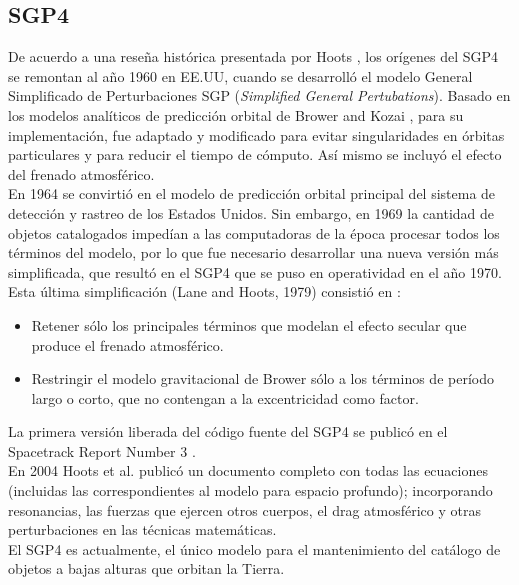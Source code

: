 {\subsection{SGP4}\label{subsec:sgp4model}
De acuerdo a una rese\~na hist\'orica presentada por Hoots \citep{hootshistoria}, los or\'igenes del SGP4 se remontan al a\~no 1960 en EE.UU, cuando se desarroll\'o el modelo General Simplificado de Perturbaciones SGP  ({\it{Simplified General Pertubations}}). Basado en los modelos anal\'iticos de predicci\'on orbital de Brower \citep{brouwer1959solution} and Kozai \citep{kozai1962second}, para su implementaci\'on, fue adaptado y modificado para evitar singularidades en \'orbitas particulares y para reducir el tiempo de c\'omputo. As\'i mismo se incluy\'o el efecto del frenado atmosf\'erico.\\
En 1964 se convirti\'o en el modelo de predicci\'on orbital principal del sistema de detecci\'on y rastreo de los Estados Unidos.
Sin embargo, en 1969 la cantidad de objetos catalogados imped\'ian a las computadoras de la \'epoca procesar todos los t\'erminos del modelo, por lo que fue necesario desarrollar una nueva versi\'on m\'as simplificada, que result\'o en el SGP4 que se puso en operatividad en el a\~no 1970.\\

Esta \'ultima simplificaci\'on (Lane and Hoots, 1979) consisti\'o en :\\
\begin{itemize}
 \item Retener s\'olo los principales t\'erminos que modelan el efecto secular que produce el frenado atmosf\'erico.
 \item Restringir el modelo gravitacional de Brower s\'olo a los t\'erminos de per\'iodo largo o corto, que no contengan a la excentricidad como factor.
\end{itemize}

La primera versi\'on liberada del c\'odigo fuente del SGP4 se public\'o en el Spacetrack Report Number 3 \citep{spacetrackreport3}.\\
En 2004 Hoots et al. public\'o un documento completo con todas las ecuaciones (incluidas las correspondientes al modelo para espacio profundo); incorporando resonancias, las fuerzas que ejercen otros cuerpos, el drag atmosf\'erico y otras perturbaciones en las t\'ecnicas matem\'aticas.\\

El SGP4 es actualmente, el \'unico modelo para el mantenimiento del cat\'alogo de objetos a bajas alturas que orbitan la Tierra. 

}
